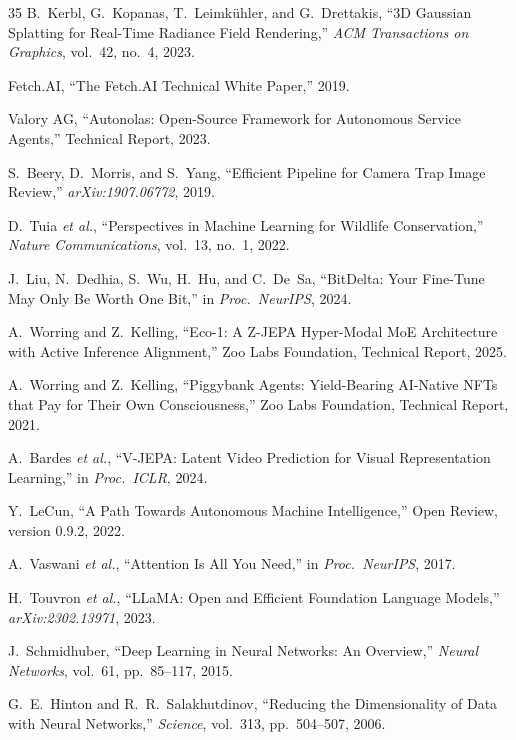 \documentclass[11pt,letterpaper]{article}
\begin{document}
\begin{thebibliography}{35}
B.~Kerbl, G.~Kopanas, T.~Leimk{\"u}hler, and G.~Drettakis, ``3D Gaussian Splatting for Real-Time Radiance Field Rendering,'' \emph{ACM Transactions on Graphics}, vol.~42, no.~4, 2023.

Fetch.AI, ``The Fetch.AI Technical White Paper,'' 2019.

Valory AG, ``Autonolas: Open-Source Framework for Autonomous Service Agents,'' Technical Report, 2023.

S.~Beery, D.~Morris, and S.~Yang, ``Efficient Pipeline for Camera Trap Image Review,'' \emph{arXiv:1907.06772}, 2019.

D.~Tuia \emph{et al.}, ``Perspectives in Machine Learning for Wildlife Conservation,'' \emph{Nature Communications}, vol.~13, no.~1, 2022.

J.~Liu, N.~Dedhia, S.~Wu, H.~Hu, and C.~De~Sa, ``BitDelta: Your Fine-Tune May Only Be Worth One Bit,'' in \emph{Proc.\ NeurIPS}, 2024.

A.~Worring and Z.~Kelling, ``Eco-1: A Z-JEPA Hyper-Modal MoE Architecture with Active Inference Alignment,'' Zoo Labs Foundation, Technical Report, 2025.

A.~Worring and Z.~Kelling, ``Piggybank Agents: Yield-Bearing AI-Native NFTs that Pay for Their Own Consciousness,'' Zoo Labs Foundation, Technical Report, 2021.

A.~Bardes \emph{et al.}, ``V-JEPA: Latent Video Prediction for Visual Representation Learning,'' in \emph{Proc.\ ICLR}, 2024.

Y.~LeCun, ``A Path Towards Autonomous Machine Intelligence,'' Open Review, version 0.9.2, 2022.

A.~Vaswani \emph{et al.}, ``Attention Is All You Need,'' in \emph{Proc.\ NeurIPS}, 2017.

H.~Touvron \emph{et al.}, ``LLaMA: Open and Efficient Foundation Language Models,'' \emph{arXiv:2302.13971}, 2023.

J.~Schmidhuber, ``Deep Learning in Neural Networks: An Overview,'' \emph{Neural Networks}, vol.~61, pp.~85--117, 2015.

G.~E.~Hinton and R.~R.~Salakhutdinov, ``Reducing the Dimensionality of Data with Neural Networks,'' \emph{Science}, vol.~313, pp.~504--507, 2006.


\end{thebibliography}
\end{document}
